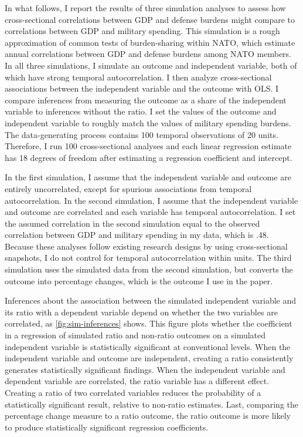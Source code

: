 \documentclass[12pt]{article}
\begin{document}
In what follows, I report the results of three simulation analyses to assess how cross-sectional correlations between GDP and defense burdens might compare to correlations between GDP and military spending. 
This simulation is a rough approximation of common tests of burden-sharing within NATO, which estimate annual correlations between GDP and defense burdens among NATO members. 
In all three simulations, I simulate an outcome and independent variable, both of which have strong temporal autocorrelation. 
I then analyze cross-sectional associations between the independent variable and the outcome with OLS. 
I compare inferences from measuring the outcome as a share of the independent variable to inferences without the ratio. 
I set the values of the outcome and independent variable to roughly match the values of military spending burdens. 
The data-generating process contains 100 temporal observations of 20 units. 
Therefore, I run 100 cross-sectional analyses and each linear regression estimate has 18 degrees of freedom after estimating a regression coefficient and intercept.  

 
In the first simulation, I assume that the independent variable and outcome are entirely uncorrelated, except for spurious associations from temporal autocorrelation. 
In the second simulation, I assume that the independent variable and outcome are correlated and each variable has temporal autocorrelation. 
I set the assumed correlation in the second simulation equal to the observed correlation between GDP and military spending in my data, which is .48. 
Because these analyses follow existing research designs by using cross-sectional snapshots, I do not control for temporal autocorrelation within units. 
The third simulation uses the simulated data from the second simulation, but converts the outcome into percentage changes, which is the outcome I use in the paper. 


Inferences about the association between the simulated independent variable and its ratio with a dependent variable depend on whether the two variables are correlated, as \autoref{fig:sim-inferences} shows. 
This figure plots whether the coefficient in a regression of simulated ratio and non-ratio outcomes on a simulated independent variable is statistically significant at conventional levels. 
When the independent variable and outcome are independent, creating a ratio consistently generates statistically significant findings. 
When the independent variable and dependent variable are correlated, the ratio variable has a different effect. 
Creating a ratio of two correlated variables reduces the probability of a statistically significant result, relative to non-ratio estimates. 
Last, comparing the percentage change measure to a ratio outcome, the ratio outcome is more likely to produce statistically significant regression coefficients. 
\end{document}
